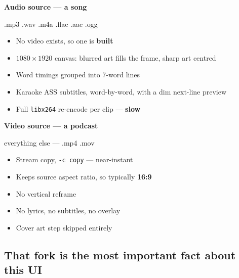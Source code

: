 \documentclass[11pt,a4paper]{article}
\newcommand{\code}[1]{\texttt{\small #1}}
\begin{document}
\vspace{4pt}
\noindent
\begin{minipage}[t]{0.48\linewidth}
\begin{tcolorbox}[enhanced,colback=cardbg,colframe=accent,boxrule=0pt,
  toprule=3pt,arc=0pt,left=10pt,right=10pt,top=9pt,bottom=9pt]
{\sffamily\bfseries Audio source --- a song}\par
{\ttfamily\scriptsize\color{muted}.mp3 .wav .m4a .flac .aac .ogg}\par\vspace{6pt}
\begin{itemize}[leftmargin=1em]\small
\item No video exists, so one is \textbf{built}
\item $1080\times1920$ canvas: blurred art fills the frame, sharp art centred
\item Word timings grouped into 7-word lines
\item Karaoke ASS subtitles, word-by-word, with a dim next-line preview
\item Full \code{libx264} re-encode per clip --- \textbf{slow}
\end{itemize}
\end{tcolorbox}
\end{minipage}\hfill
\begin{minipage}[t]{0.48\linewidth}
\begin{tcolorbox}[enhanced,colback=cardbg,colframe=muted,boxrule=0pt,
  toprule=3pt,arc=0pt,left=10pt,right=10pt,top=9pt,bottom=9pt]
{\sffamily\bfseries Video source --- a podcast}\par
{\ttfamily\scriptsize\color{muted}everything else --- .mp4 .mov}\par\vspace{6pt}
\begin{itemize}[leftmargin=1em]\small
\item Stream copy, \code{-c copy} --- near-instant
\item Keeps source aspect ratio, so typically \textbf{16:9}
\item No vertical reframe
\item No lyrics, no subtitles, no overlay
\item Cover art step skipped entirely
\end{itemize}
\end{tcolorbox}
\end{minipage}

\subsection{That fork is the most important fact about this UI}
\end{document}
